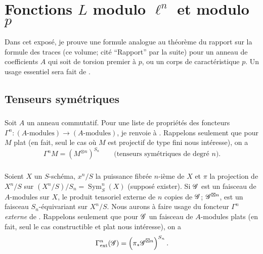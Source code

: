 \chapter{Fonctions \texorpdfstring{$L$}{L} modulo \texorpdfstring{$\ell^n$}{l n} et modulo \texorpdfstring{$p$}{p}}\label{III}

Dans cet exposé, je prouve une formule analogue au théorème du rapport sur 
la formule des traces (ce volume; cité ``Rapport'' par la suite) pour un 
anneau de coefficients $A$ qui soit de torsion premier à $p$, ou un corps de 
caractéristique $p$. Un usage essentiel sera fait de \cite[XVII 5.5]{sga4}. 










\section{Tenseurs symétriques}\label{III:1}





\subsection{}\label{III:1-1}

Soit $A$ un anneau commutatif. Pour une liste de propriétés des foncteurs 
$\Gamma^n:(\text{$A$-modules})\to (\text{$A$-modules})$, je renvoie à 
\cite[XVII 5.5.1 et 2]{sga4}. Rappelons seulement que pour $M$ plat (en fait, seul 
le cas où $M$ est projectif de type fini nous intéresse), on a 
\[
  \Gamma^n M = \left(M^{\otimes n}\right)^{S_n} \qquad \text{(tenseurs symétriques de degré $n$).}
\]





\subsection{}\label{III:1-2}

Soient $X$ un $S$-schéma, $x^n/S$ la puissance fibrée $n$-ième de $X$ et 
$\pi$ la projection de $X^n/S$ sur $(X^n/S)/S_n=\operatorname{Sym}_S^n(X)$ 
(supposé exister). Si $\mathscr{G}$ est un faisceau de $A$-modules sur $X$, le 
produit tensoriel externe de $n$ copies de $\mathscr{G}$; $\mathscr{G}^{\boxtimes n}$, est un 
faisceau $S_n$-équivariant sur $X^n/S$. Nous aurons à faire usage du 
foncteur $\Gamma^n$ \emph{externe} de \cite[XVII 5.5.7 à 9]{sga4}. Rappelons 
seulement que pour $\mathscr{G}$ un faisceau de $A$-modules plats (en fait, seul le cas 
constructible et plat nous intéresse), on a 
\[
  \Gamma_\text{ext}^n(\mathscr{G}) = \left(\pi_*\mathscr{G}^{\boxtimes n}\right)^{S_n} \text{.}
\]






